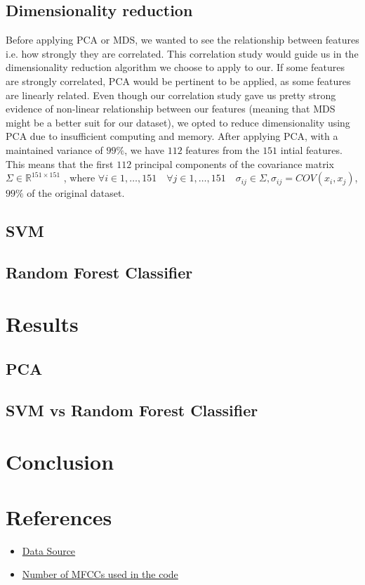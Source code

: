 \documentclass[11pt]{article}
\begin{document}
\subsection{Dimensionality reduction}
Before applying PCA or MDS, we wanted to see the relationship between features i.e. how strongly they are correlated. This correlation study would guide us in the dimensionality reduction algorithm we choose to apply to our. If some features are strongly correlated, PCA would be pertinent to be applied, as some features are linearly related. Even though our correlation study gave us pretty strong evidence of non-linear relationship between our features (meaning that MDS might be a better suit for our dataset), we opted to reduce dimensionality using PCA due to insufficient computing and memory. After applying PCA, with a maintained variance of $99\%$, we have $112$ features from the $151$ intial features. This means that the first $112$ principal components of the covariance matrix $\Sigma \in \mathbb{R}^{151 \times 151}$ , where $\forall i \in 1, \ldots, 151 \quad \forall j \in 1, \ldots, 151 \quad \sigma_{ij} \in \Sigma, \sigma_{ij} = COV(x_i, x_j)$, $99\%$ of the original dataset.
\subsection{SVM}



\subsection{Random Forest Classifier}

\section{Results}
\subsection{PCA}
 
\subsection{SVM vs Random Forest Classifier}

\section{Conclusion}


\section{References}
\begin{itemize}
    \item \href{https://huggingface.co/datasets/common_language}{Data Source}
    \item \href{https://ietresearch.onlinelibrary.wiley.com/doi/full/10.1049/tje2.12082#:~:text=All\%20performance\%20metrics\%20gave\%20the,studies\%20use\%20only\%2013\%20MFCCs}{Number of MFCCs used in the code}
\end{itemize}
\end{document}
